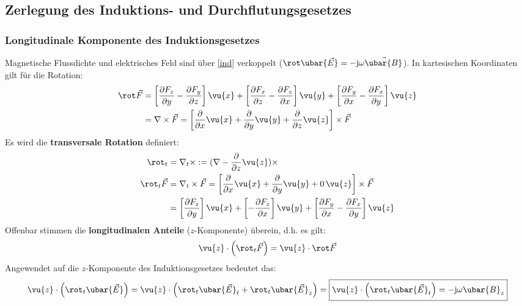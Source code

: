 	\subsection{Zerlegung des Induktions- und Durchflutungsgesetzes}
		\subsubsection{Longitudinale Komponente des Induktionsgesetzes}
	  Magnetische Flussdichte und elektrisches Feld sind über \ref{ind} verkoppelt (\(\rot \ubar{\vec{E}} = -\mathrm{j}\omega\vec{\ubar{B}}\)). In kartesischen Koordinaten gilt für die Rotation:
	\begin{equation}\begin{split}
			\rot \vec{F} &= \left[ \frac{\partial F_{z}}{\partial y} - \frac{\partial F_{y}}{\partial z} \right] \vu{x} + \left[ \frac{\partial F_{x}}{\partial z} - \frac{\partial F_{z}}{\partial x} \right] \vu{y } + \left[ \frac{\partial F_{y}}{\partial x} - \frac{\partial F_{x}}{\partial y}\right] \vu{z} \\
			&=\nabla \times \vec{F} = \left[ \frac{\partial}{\partial x}\vu{x} + \frac{\partial}{\partial y}\vu{y} + \frac{\partial}{\partial z}\vu{z}\right] \times \vec{F}
	\end{split}\end{equation}
	Es wird die \textbf{transversale Rotation} definiert:
	\begin{equation}\label{transvrot}\begin{split}
			\rot _t & = \nabla_t \times := (\nabla - \frac{\partial}{\partial z} \vu{z}) \times\\
			\rot _t \vec{F} &= \nabla_t \times \vec{F} = \left[ \frac{\partial}{\partial x}\vu{x} + \frac{\partial}{\partial y}\vu{y} + 0\, \vu{z}\right] \times \vec{F}\\
			&=  \left[ \frac{\partial F_{z}}{\partial y} \right] \vu{x} + \left[ - \frac{\partial F_{z}}{\partial x} \right] \vu{y } + \left[ \frac{\partial F_{y}}{\partial x} - \frac{\partial F_{x}}{\partial y}\right] \vu{z}
	\end{split}\end{equation}
	 Offenbar stimmen die \textbf{longitudinalen Anteile} (\(z\)-Komponente) überein, d.h. es gilt:
	\begin{equation}
		\vu{z} \cdot \left(\rot _t \vec{F}\right) = \vu{z} \cdot \rot \vec{F}
	\end{equation}
	 Angewendet auf die \(z\)-Komponente des Induktionsgesetzes bedeutet das:
	\begin{equation}\label{longind}
		\vu{z} \cdot \left(\rot _t \ubar{\vec{E}}\right)=\vu{z} \cdot \left(\rot _t \ubar{\vec{E}}_t + \rot _t \ubar{\vec{E}}_z\right) =\boxed{\vu{z} \cdot \left(\rot _t \ubar{\vec{E}}_t\right) = -\mathrm{j}\omega\ubar{B}_z}
	\end{equation}
